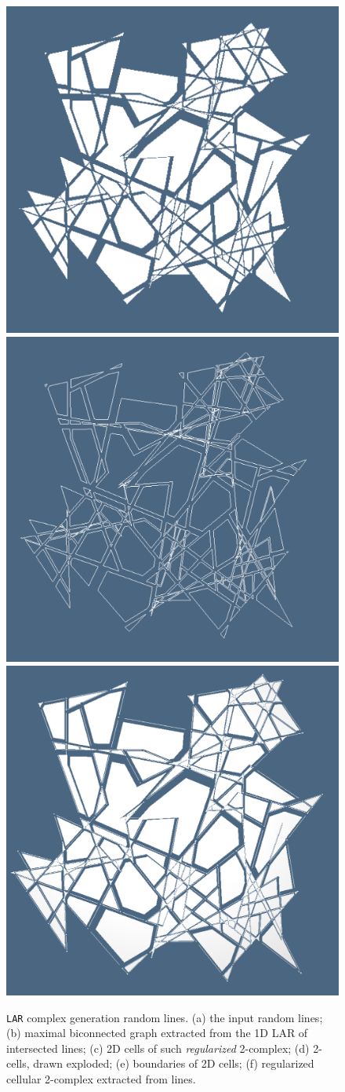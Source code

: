 \documentclass[11pt,oneside]{article}    %
\begin{document}
\begin{figure}[htbp]
   \includegraphics[height=0.325\linewidth,width=0.325\linewidth]{images/random2d3} 
   \includegraphics[height=0.325\linewidth,width=0.325\linewidth]{images/random2d4} 
   \includegraphics[height=0.325\linewidth,width=0.325\linewidth]{images/random2d5} 
   \caption{\texttt{LAR} complex generation random lines. (a) the input random lines; (b) maximal biconnected graph extracted from the 1D LAR of intersected lines; (c) 2D cells of such \emph{regularized} 2-complex; (d) 2-cells, drawn exploded; (e) boundaries of 2D cells; (f) regularized cellular 2-complex extracted from lines.}
   \label{fig:ortho}
\end{figure}
\end{document}
